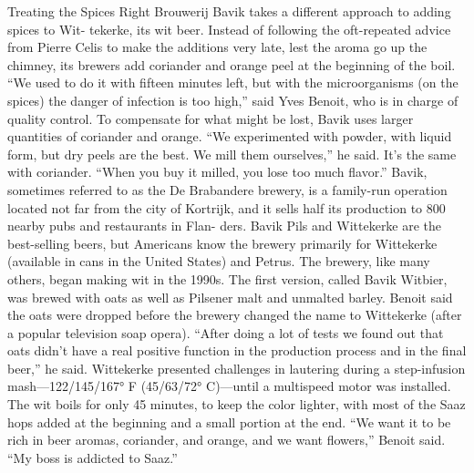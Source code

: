 \documentclass[a4paper,parskip=half]{scrartcl}
\begin{document}
\parencite[62]{Hieronymus2010}

Treating the Spices Right
Brouwerij Bavik takes a different approach to adding spices to Wit-
tekerke, its wit beer. Instead of following the oft-repeated advice
from Pierre Celis to make the additions very late, lest the aroma go
up the chimney, its brewers add coriander and orange peel at the
beginning of the boil. “We used to do it with fifteen minutes left,
but with the microorganisms (on the spices) the danger of infection
is too high,” said Yves Benoit, who is in charge of quality control.
To compensate for what might be lost, Bavik uses larger quantities
of coriander and orange.
“We experimented with powder, with liquid form, but dry peels are
the best. We mill them ourselves,” he said. It’s the same with coriander.
“When you buy it milled, you lose too much flavor.”
Bavik, sometimes referred to as the De Brabandere brewery, is a
family-run operation located not far from the city of Kortrijk, and it
sells half its production to 800 nearby pubs and restaurants in Flan-
ders. Bavik Pils and Wittekerke are the best-selling beers, but Americans
know the brewery primarily for Wittekerke (available in cans in the
United States) and Petrus.
The brewery, like many others, began making wit in the 1990s.
The first version, called Bavik Witbier, was brewed with oats as well as
Pilsener malt and unmalted barley. Benoit said the oats were dropped
before the brewery changed the name to Wittekerke (after a popular
television soap opera). “After doing a lot of tests we found out that oats
didn’t have a real positive function in the production process and in the
final beer,” he said.
Wittekerke presented challenges in lautering during a step-infusion
mash—122/145/167° F (45/63/72° C)—until a multispeed motor was
installed. The wit boils for only 45 minutes, to keep the color lighter,
with most of the Saaz hops added at the beginning and a small portion
at the end. “We want it to be rich in beer aromas, coriander, and orange,
and we want flowers,” Benoit said. “My boss is addicted to Saaz.”

\parencite[63]{Hieronymus2010}
\end{document}
